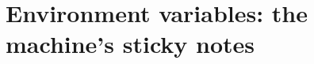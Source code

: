 \chapter{Environment variables: the machine's sticky notes}
\label{ch:environment-variables-the-machine-s}

